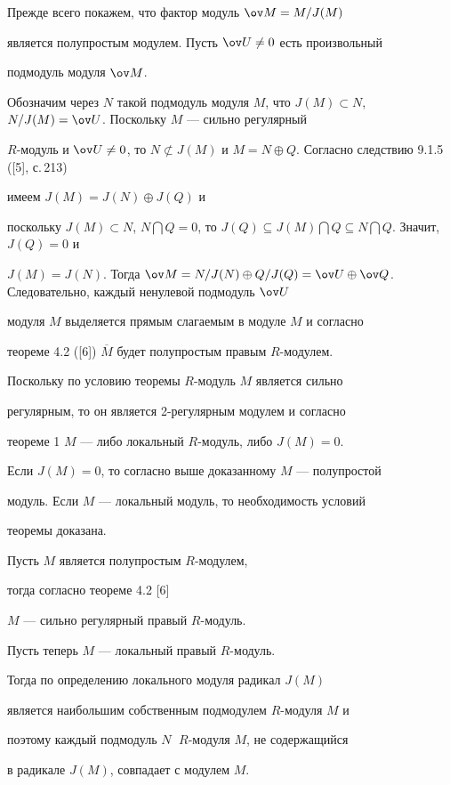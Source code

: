 \begin{pf} Прежде всего покажем, что фактор модуль $\ov M= M/J(M)$


является полупростым модулем. Пусть $\ov U \ne 0$ есть произвольный


подмодуль модуля $\ov M$.


Обозначим через $N$ такой подмодуль модуля $M$, что $J(M)


\subset N$, $N/J(M)= \ov U$. Поскольку $M$ --- сильно регулярный


$R$-модуль и $\ov U \ne 0$, то $N \not\subset J(M)$ и $M=N


\oplus Q$. Согласно следствию 9.1.5 ([5], с.\,213)


имеем $J(M)=J(N) \oplus J(Q)$ и


поскольку $J(M) \subset N$, $N \bigcap Q =0$, то $J(Q) \subseteq


J(M) \bigcap Q \subseteq N \bigcap Q$. Значит, $J(Q)=0$ и


$J(M)=J(N)$. Тогда $\ov M= N/J(N) \oplus Q/J(Q)=\ov U \oplus


\ov Q$. Следовательно, каждый ненулевой подмодуль $\ov U$


модуля $M$ выделяется прямым слагаемым в модуле $M$ и согласно


теореме 4.2 ([6]) $\overline M$ будет полупростым правым $R$-модулем.





Поскольку по условию теоремы $R$-модуль $M$ является сильно


регулярным, то он является 2-регулярным модулем и согласно


теореме 1\; $M$ --- либо локальный $R$-модуль, либо $J(M)=0$.


Если $J(M)=0$, то согласно выше доказанному $M$ --- полупростой


модуль. Если $M$ --- локальный модуль, то необходимость условий


теоремы доказана.








Пусть $M$ является полупростым $R$-модулем,


тогда согласно теореме 4.2 [6]


$M$ --- сильно регулярный правый $R$-модуль.





Пусть теперь $M$ --- локальный правый $R$-модуль.


Тогда по определению локального модуля радикал $J(M)$


является наибольшим собственным подмодулем $R$-модуля $M$ и


поэтому каждый подмодуль $N\;$ $R$-модуля $M$, не содержащийся


в радикале $J(M)$, совпадает с модулем $M$.


\end{pf}





